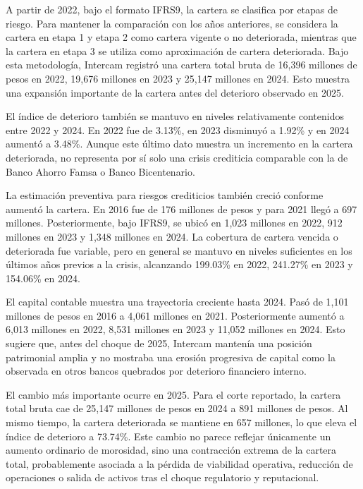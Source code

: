 A partir de 2022, bajo el formato IFRS9, la cartera se clasifica por etapas de riesgo. Para mantener la comparación con los años anteriores, se considera la cartera en etapa 1 y etapa 2 como cartera vigente o no deteriorada, mientras que la cartera en etapa 3 se utiliza como aproximación de cartera deteriorada. Bajo esta metodología, Intercam registró una cartera total bruta de 16,396 millones de pesos en 2022, 19,676 millones en 2023 y 25,147 millones en 2024. Esto muestra una expansión importante de la cartera antes del deterioro observado en 2025.

El índice de deterioro también se mantuvo en niveles relativamente contenidos entre 2022 y 2024. En 2022 fue de 3.13\%, en 2023 disminuyó a 1.92\% y en 2024 aumentó a 3.48\%. Aunque este último dato muestra un incremento en la cartera deteriorada, no representa por sí solo una crisis crediticia comparable con la de Banco Ahorro Famsa o Banco Bicentenario.

La estimación preventiva para riesgos crediticios también creció conforme aumentó la cartera. En 2016 fue de 176 millones de pesos y para 2021 llegó a 697 millones. Posteriormente, bajo IFRS9, se ubicó en 1,023 millones en 2022, 912 millones en 2023 y 1,348 millones en 2024. La cobertura de cartera vencida o deteriorada fue variable, pero en general se mantuvo en niveles suficientes en los últimos años previos a la crisis, alcanzando 199.03\% en 2022, 241.27\% en 2023 y 154.06\% en 2024.

El capital contable muestra una trayectoria creciente hasta 2024. Pasó de 1,101 millones de pesos en 2016 a 4,061 millones en 2021. Posteriormente aumentó a 6,013 millones en 2022, 8,531 millones en 2023 y 11,052 millones en 2024. Esto sugiere que, antes del choque de 2025, Intercam mantenía una posición patrimonial amplia y no mostraba una erosión progresiva de capital como la observada en otros bancos quebrados por deterioro financiero interno.

El cambio más importante ocurre en 2025. Para el corte reportado, la cartera total bruta cae de 25,147 millones de pesos en 2024 a 891 millones de pesos. Al mismo tiempo, la cartera deteriorada se mantiene en 657 millones, lo que eleva el índice de deterioro a 73.74\%. Este cambio no parece reflejar únicamente un aumento ordinario de morosidad, sino una contracción extrema de la cartera total, probablemente asociada a la pérdida de viabilidad operativa, reducción de operaciones o salida de activos tras el choque regulatorio y reputacional.

